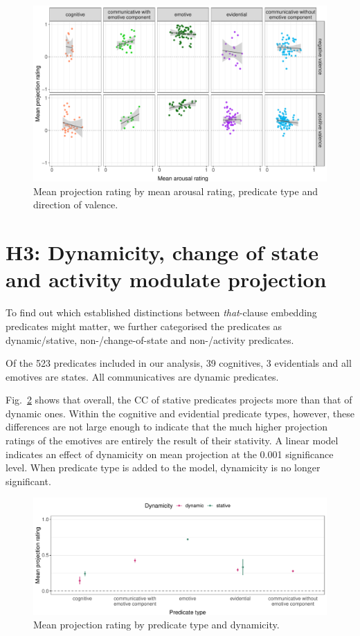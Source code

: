 \documentclass[11pt,fleqn]{article}
\newcommand{\figref}[1]{Fig.~\ref{#1}}
\newcommand{\6}{\mbox{$[\hspace*{-.6mm}[$}}
\newcommand{\9}{\mbox{$]\hspace*{-.6mm}]$}}
\begin{document}
\begin{figure}[H]
	\centering
	\includegraphics[width=.8\textwidth]{projection-by-arousal-and-direction-of-valence-faceted2}
	\caption{Mean projection rating by mean arousal rating, predicate type and direction of valence.}
	\label{projAfac}
\end{figure}

\section{H3: Dynamicity, change of state and activity modulate projection}

To find out which established distinctions between \emph{that}-clause embedding predicates might matter, we further categorised the predicates as dynamic/stative, non-/change-of-state and non-/activity predicates.

Of the 523 predicates included in our analysis, 39 cognitives, 3 evidentials and all emotives are states. All communicatives are dynamic predicates.

\figref{projdyn} shows that overall, the CC of stative predicates projects more than that of dynamic ones. Within the cognitive and evidential predicate types, however, these differences are not large enough to indicate that the much higher projection ratings of the emotives are entirely the result of their stativity. A linear model indicates an effect of dynamicity on mean projection at the 0.001 significance level. When predicate type is added to the model, dynamicity is no longer significant.

\begin{figure}[H]
	\centering
	\includegraphics[width=1\textwidth]{projection-by-predicateType-and-Dynamicity}
	\caption{Mean projection rating by predicate type and dynamicity.}
	\label{projdyn}
\end{figure}
\end{document}
